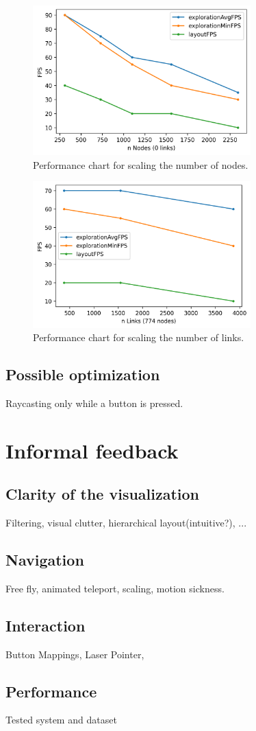 \begin{figure}[h]
    \centering
    \includegraphics[width=0.75\textwidth]{graphics/performanceAnalysisNodes.png}
    \caption{Performance chart for scaling the number of nodes.} 
    \label{fig:performanceNodes} 
\end{figure}

\begin{figure}[h]
    \centering
    \includegraphics[width=0.75\textwidth]{graphics/performanceAnalysisLinks.png}
    \caption{Performance chart for scaling the number of links.} 
    \label{fig:performanceLinks} 
\end{figure}

\subsection{Possible optimization}

Raycasting only while a button is pressed. 

\section{Informal feedback}

\subsection{Clarity of the visualization}
Filtering, visual clutter, hierarchical layout(intuitive?), ...

\subsection{Navigation}
Free fly, animated teleport, scaling, motion sickness.

\subsection{Interaction}
Button Mappings, Laser Pointer, 

\subsection{Performance}
Tested system and dataset